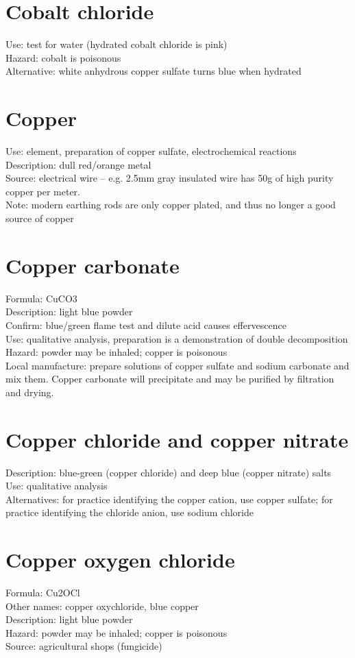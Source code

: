 \section{Cobalt chloride}
Use: test for water (hydrated cobalt chloride is pink)\\
Hazard: cobalt is poisonous\\
Alternative: white anhydrous copper sulfate turns blue when hydrated

\section{Copper}
Use: element, 
preparation of copper sulfate, 
electrochemical reactions\\
Description: dull red/orange metal\\
Source: electrical wire – e.g. 
2.5mm gray insulated wire has 50g of high purity copper per meter.\\
Note: modern earthing rods are only copper plated, 
and thus no longer a good source of copper

\section{Copper carbonate}
Formula: CuCO3\\
Description: light blue powder\\
Confirm: blue/green flame test and dilute acid causes effervescence\\
Use: qualitative analysis, 
preparation is a demonstration of double decomposition\\
Hazard: powder may be inhaled; 
copper is poisonous\\
Local manufacture: prepare solutions of copper sulfate 
and sodium carbonate and mix them. 
Copper carbonate will precipitate 
and may be purified by filtration and drying.

\section{Copper chloride and copper nitrate}
Description: blue-green (copper chloride) 
and deep blue (copper nitrate) salts \\
Use: qualitative analysis\\
Alternatives: for practice identifying the copper cation, 
use copper sulfate; 
for practice identifying the chloride anion, 
use sodium chloride

\section{Copper oxygen chloride}
Formula: Cu2OCl\\
Other names: copper oxychloride, 
blue copper\\
Description: light blue powder\\
Hazard: powder may be inhaled; 
copper is poisonous\\
Source: agricultural shops (fungicide)


